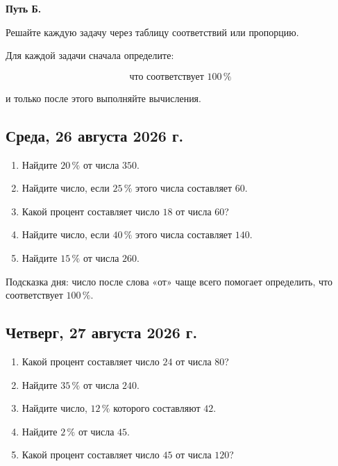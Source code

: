 \documentclass[a4paper,12pt]{article}
\newcommand{\pct}[1]{#1\,\%}
\begin{document}
\textbf{Путь Б.}

Решайте каждую задачу через таблицу соответствий или пропорцию.

Для каждой задачи сначала определите:

\[
\boxed{\text{что соответствует }\pct{100}}
\]

и только после этого выполняйте вычисления.


\subsection*{\textcolor{darkaccent}{Среда, 26 августа 2026 г.}}

\begin{enumerate}
    \item Найдите \(\pct{20}\) от числа \(350\).

    \item Найдите число, если \(\pct{25}\) этого числа составляет \(60\).

    \item Какой процент составляет число \(18\) от числа \(60\)?

    \item Найдите число, если \(\pct{40}\) этого числа составляет \(140\).

    \item Найдите \(\pct{15}\) от числа \(260\).
\end{enumerate}

\vspace{0.7cm}

\textcolor{softgray}{
Подсказка дня: число после слова «от» чаще всего помогает определить,
что соответствует \(\pct{100}\).
}


\subsection*{\textcolor{darkaccent}{Четверг, 27 августа 2026 г.}}

\begin{enumerate}
    \item Какой процент составляет число \(24\) от числа \(80\)?

    \item Найдите \(\pct{35}\) от числа \(240\).

    \item Найдите число, \(\pct{12}\) которого составляют \(42\).

    \item Найдите \(\pct{2}\) от числа \(45\).

    \item Какой процент составляет число \(45\) от числа \(120\)?
\end{enumerate}
\end{document}
